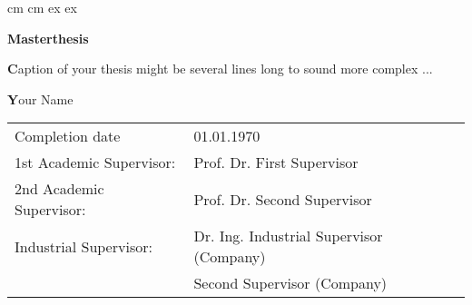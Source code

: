 
 cm                
 cm
\topmargin -15mm
 ex 			
 ex
\raggedbottom
\oddsidemargin -6.5mm    	
\evensidemargin -16.5mm 
%
\newcommand{\thesis}{Masterthesis}
\newcommand{\writer}{Your Name}
\newcommand{\completiondate}{01.01.1970}
\newcommand{\topic}{Caption of your thesis might be several lines long to sound more complex ... }
\newcommand{\supervisor}{Prof. Dr. First Supervisor}
\newcommand{\supervisorsec}{Prof. Dr. Second Supervisor}
\newcommand{\supervisorindustrial}{Dr. Ing. Industrial Supervisor (Company)}
\newcommand{\supervisorindustrialsec}{Second Supervisor (Company)}
\thispagestyle{empty} 
\vspace{-20mm}
\begin{minipage}[t]{8cm}  
\end{minipage}
\hfill
\vspace{30mm}
\begin{center}{\Huge \textbf{\thesis}} \par
\vspace{20mm} \baselineskip 35pt
{\LARGE\textbf  \topic} \par
\vspace{16mm}
{\LARGE\textbf  \writer} \par
\end{center}
% 
\vspace{20mm}
\vfill
\begin{tabular}{lp{382pt}}
Completion date	 		 &  \completiondate \\[5ex]
1st Academic Supervisor:	 &  \supervisor \\[0.5ex]
2nd Academic Supervisor:	 &  \supervisorsec \\[0.5ex]
Industrial Supervisor:	 &  \supervisorindustrial \\ 
					     & 	\supervisorindustrialsec
\end{tabular}
\newpage
\thispagestyle{empty}
\rule[0ex]{0ex}{0ex} 	
\newpage
\thispagestyle{empty} 

